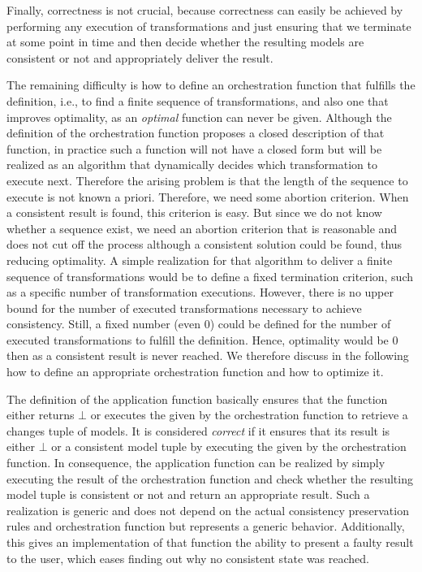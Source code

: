 Finally, correctness is not crucial, because correctness can easily be achieved by performing any execution of transformations and just ensuring that we terminate at some point in time and then decide whether the resulting models are consistent or not and appropriately deliver the result.

The remaining difficulty is how to define an orchestration function that fulfills the definition, i.e., to find a finite sequence of transformations, and also one that improves optimality, as an \emph{optimal} function can never be given.
Although the definition of the orchestration function proposes a closed description of that function, in practice such a function will not have a closed form but will be realized as an algorithm that dynamically decides which transformation to execute next.
Therefore the arising problem is that the length of the sequence to execute is not known a priori. Therefore, we need some abortion criterion. When a consistent result is found, this criterion is easy. But since we do not know whether a sequence exist, we need an abortion criterion that is reasonable and does not cut off the process although a consistent solution could be found, thus reducing optimality.
A simple realization for that algorithm to deliver a finite sequence of transformations would be to define a fixed termination criterion, such as a specific number of transformation executions. However, there is no upper bound for the number of executed transformations necessary to achieve consistency. Still, a fixed number (even 0) could be defined for the number of executed transformations to fulfill the definition. Hence, optimality would be 0 then as a consistent result is never reached. We therefore discuss in the following how to define an appropriate orchestration function and how to optimize it.

The definition of the application function basically ensures that the function either returns $\bot$ or executes the \modellevelconsistencypreservationrules given by the orchestration function to retrieve a changes tuple of models.
It is considered \emph{correct} if it ensures that its result is either $\bot$ or a consistent model tuple by executing the \modellevelconsistencypreservationrules given by the orchestration function.
In consequence, the application function can be realized by simply executing the result of the orchestration function and check whether the resulting model tuple is consistent or not and return an appropriate result.
Such a realization is generic and does not depend on the actual consistency preservation rules and orchestration function but represents a generic behavior.
Additionally, this gives an implementation of that function the ability to present a faulty result to the user, which eases finding out why no consistent state was reached.

